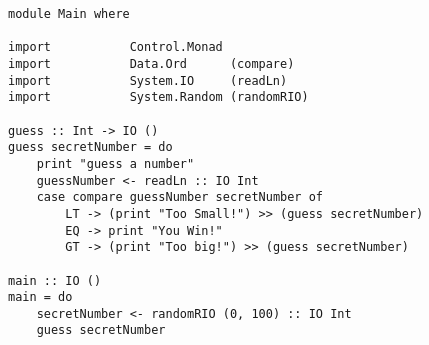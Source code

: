 \begin{verbatim}
module Main where

import           Control.Monad
import           Data.Ord      (compare)
import           System.IO     (readLn)
import           System.Random (randomRIO)

guess :: Int -> IO ()
guess secretNumber = do
    print "guess a number"
    guessNumber <- readLn :: IO Int
    case compare guessNumber secretNumber of
        LT -> (print "Too Small!") >> (guess secretNumber)
        EQ -> print "You Win!"
        GT -> (print "Too big!") >> (guess secretNumber)

main :: IO ()
main = do
    secretNumber <- randomRIO (0, 100) :: IO Int
    guess secretNumber
\end{verbatim}
